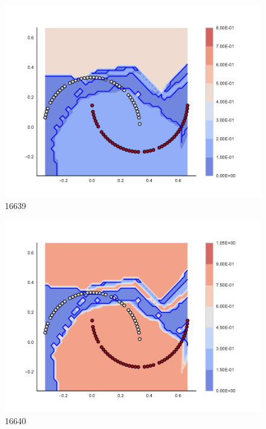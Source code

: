 \begin{subfigure}[b]{0.09\textwidth}
    \includegraphics[clip, trim=2.35cm 1.75cm 4.5cm 0cm,width=\textwidth]{img/convergence/16639.pdf}
    \caption{16639}
    \label{fig:convergence_16639}
\end{subfigure}
%
\begin{subfigure}[b]{0.09\textwidth}
    \includegraphics[clip, trim=2.35cm 1.75cm 4.5cm 0cm,width=\textwidth]{img/convergence/16640.pdf}
    \caption{16640}
    \label{fig:convergence_16640}
\end{subfigure}
%
